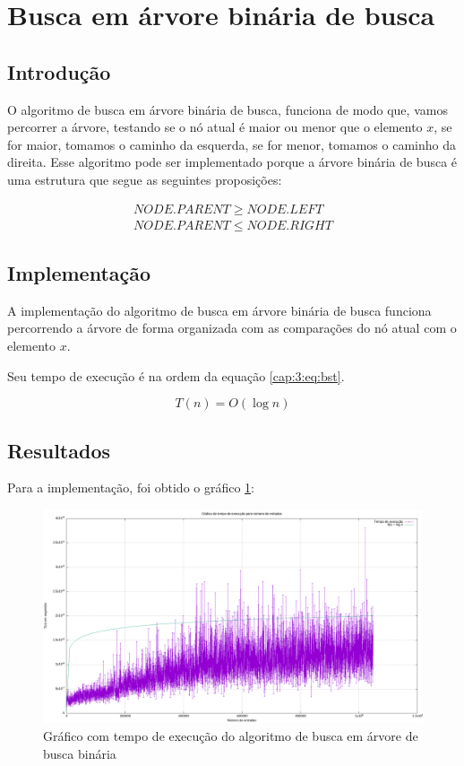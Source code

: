 \section{Busca em árvore binária de busca} \label{cap:3:section:bst}

\subsection{Introdução}

O algoritmo de busca em árvore binária de busca, funciona de modo que, vamos percorrer
a árvore, testando se o nó atual é maior ou menor que o elemento $x$, se for maior, tomamos
o caminho da esquerda, se for menor, tomamos o caminho da direita. Esse algoritmo pode ser implementado
porque a árvore binária de busca é uma estrutura que segue as seguintes proposições:

\begin{align*}
    NODE.PARENT \geq NODE.LEFT \\
    NODE.PARENT \leq NODE.RIGHT
\end{align*}

\subsection{Implementação}

A implementação do algoritmo de busca em árvore binária de busca funciona percorrendo
a árvore de forma organizada com as comparações do nó atual com o elemento $x$.



Seu tempo de execução é na ordem da equação \ref{cap:3:eq:bst}.

\begin{equation} \label{cap:3:eq:bst}
    T(n) = O(\log n)
\end{equation}

\subsection{Resultados}

Para a implementação, foi obtido o gráfico \ref{cap:3:graph:bst}:

\begin{figure}[h]
    \centering
    \includegraphics[width=\textwidth]{image/graphics/bst.png}
    \caption{Gráfico com tempo de execução do algoritmo de busca em árvore de busca binária}
    \label{cap:3:graph:bst}
\end{figure}

